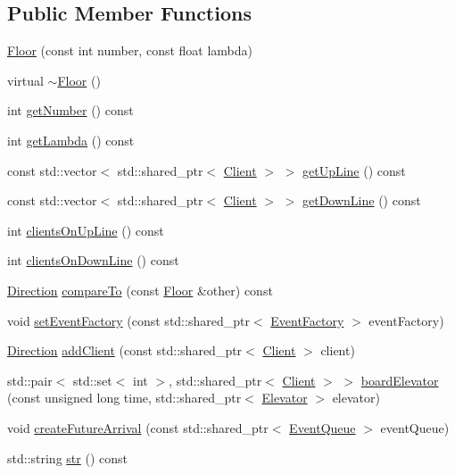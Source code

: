 \subsection*{Public Member Functions}
\begin{DoxyCompactItemize}
\item 
\hyperlink{class_floor_a984e62afde8b391aa6d431806f1a3643}{Floor} (const int number, const float lambda)
\item 
virtual \hyperlink{class_floor_ae1b805579f18a76fe2754a3601202e80}{$\sim$\+Floor} ()
\item 
int \hyperlink{class_floor_a4368d12bf63b63847f5b761c328fd133}{get\+Number} () const 
\item 
int \hyperlink{class_floor_a566668c8b6558cec6a9878043530aa6e}{get\+Lambda} () const 
\item 
const std\+::vector$<$ std\+::shared\+\_\+ptr$<$ \hyperlink{class_client}{Client} $>$ $>$ \hyperlink{class_floor_a2ae308cc91df84345d67f5b39b896a26}{get\+Up\+Line} () const 
\item 
const std\+::vector$<$ std\+::shared\+\_\+ptr$<$ \hyperlink{class_client}{Client} $>$ $>$ \hyperlink{class_floor_aef63c37a8504cd86dbc94d7444bebd7b}{get\+Down\+Line} () const 
\item 
int \hyperlink{class_floor_aab101d986c463b2fb7b3d3e979578ff3}{clients\+On\+Up\+Line} () const 
\item 
int \hyperlink{class_floor_a9c48353976d06335d7bb94bc2a97a414}{clients\+On\+Down\+Line} () const 
\item 
\hyperlink{_direction_8h_a224b9163917ac32fc95a60d8c1eec3aa}{Direction} \hyperlink{class_floor_a09cf6744871fe9b1a1db00d2afa8b723}{compare\+To} (const \hyperlink{class_floor}{Floor} \&other) const 
\item 
void \hyperlink{class_floor_a14cef459a7a9ddbdb53070d2f35add7f}{set\+Event\+Factory} (const std\+::shared\+\_\+ptr$<$ \hyperlink{class_event_factory}{Event\+Factory} $>$ event\+Factory)
\item 
\hyperlink{_direction_8h_a224b9163917ac32fc95a60d8c1eec3aa}{Direction} \hyperlink{class_floor_aa4401fd2cbfd0f194f502aa9d975339e}{add\+Client} (const std\+::shared\+\_\+ptr$<$ \hyperlink{class_client}{Client} $>$ client)
\item 
std\+::pair$<$ std\+::set$<$ int $>$, std\+::shared\+\_\+ptr$<$ \hyperlink{class_client}{Client} $>$ $>$ \hyperlink{class_floor_a4b49eea652eb6c16aaee8862c7d5fb7b}{board\+Elevator} (const unsigned long time, std\+::shared\+\_\+ptr$<$ \hyperlink{class_elevator}{Elevator} $>$ elevator)
\item 
void \hyperlink{class_floor_a92fcea5eb3324a506bfd33be2c292b35}{create\+Future\+Arrival} (const std\+::shared\+\_\+ptr$<$ \hyperlink{class_event_queue}{Event\+Queue} $>$ event\+Queue)
\item 
std\+::string \hyperlink{class_floor_a46daff13947cd7b753df0d258ec68bed}{str} () const 
\end{DoxyCompactItemize}
